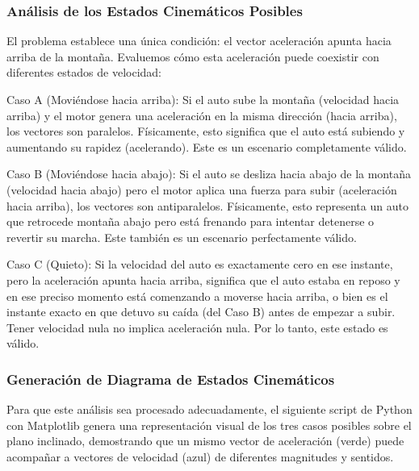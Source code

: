 \documentclass[12pt, a4paper]{article}
\begin{document}
\subsubsection*{Análisis de los Estados Cinemáticos Posibles}

El problema establece una única condición: el vector aceleración apunta hacia arriba de la montaña. Evaluemos cómo esta aceleración puede coexistir con diferentes estados de velocidad:

Caso A (Moviéndose hacia arriba): Si el auto sube la montaña (velocidad hacia arriba) y el motor genera una aceleración en la misma dirección (hacia arriba), los vectores son paralelos. Físicamente, esto significa que el auto está subiendo y aumentando su rapidez (acelerando). Este es un escenario completamente válido.

Caso B (Moviéndose hacia abajo): Si el auto se desliza hacia abajo de la montaña (velocidad hacia abajo) pero el motor aplica una fuerza para subir (aceleración hacia arriba), los vectores son antiparalelos. Físicamente, esto representa un auto que retrocede montaña abajo pero está frenando para intentar detenerse o revertir su marcha. Este también es un escenario perfectamente válido.

Caso C (Quieto): Si la velocidad del auto es exactamente cero en ese instante, pero la aceleración apunta hacia arriba, significa que el auto estaba en reposo y en ese preciso momento está comenzando a moverse hacia arriba, o bien es el instante exacto en que detuvo su caída (del Caso B) antes de empezar a subir. Tener velocidad nula no implica aceleración nula. Por lo tanto, este estado es válido.

\subsubsection*{Generación de Diagrama de Estados Cinemáticos}

Para que este análisis sea procesado adecuadamente, el siguiente script de Python con Matplotlib genera una representación visual de los tres casos posibles sobre el plano inclinado, demostrando que un mismo vector de aceleración (verde) puede acompañar a vectores de velocidad (azul) de diferentes magnitudes y sentidos.
\end{document}
